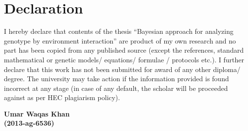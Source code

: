 \chapter*{Declaration}
\noindent
I hereby declare that contents of the thesis ``Bayesian approach for analyzing genotype by environment interaction'' are product of my own research and no part has been copied from any published source (except the references, standard mathematical or genetic models/ equations/ formulae / protocols etc.). I further declare that this work has not been submitted for award of any other diploma/ degree. The university may take action if the information provided is found incorrect at any stage (in case of any default, the scholar will be proceeded against as per HEC plagiarism policy).\\

\begin{flushright}
\textbf{Umar Waqas Khan\\
(2013-ag-6536)}
\end{flushright}